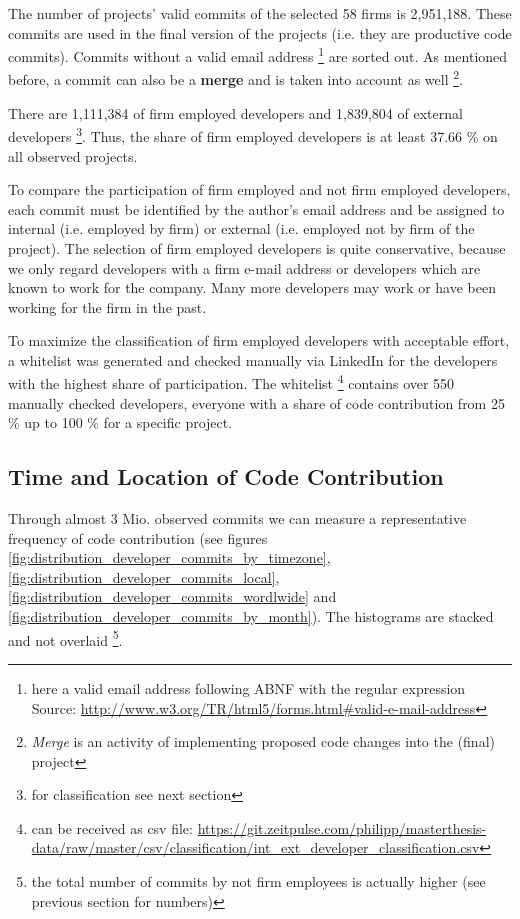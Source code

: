 The number of projects' valid commits of the selected 58 firms is 2,951,188. These commits are used in the final version of the projects (i.e. they are productive code commits). Commits without a valid email address \footnote{here a valid email address following ABNF with the regular expression
\tiny{}
Source: \url{http://www.w3.org/TR/html5/forms.html\#valid-e-mail-address}
} are sorted out. As mentioned before, a commit can also be a \textbf{merge} and is taken into account as well \footnote{\textit{Merge} is an activity of implementing proposed code changes into the (final) project}.

There are 1,111,384 of firm employed developers and 1,839,804 of external developers \footnote{for classification see next section}. Thus, the share of firm employed developers is at least 37.66 \% on all observed projects.

To compare the participation of firm employed and not firm employed developers, each commit must be identified by the author's email address and be assigned to internal (i.e. employed by firm) or external (i.e. employed not by firm of the project). The selection of firm employed developers is quite conservative, because we only regard developers with a firm e-mail address or developers which are known to work for the company. Many more developers may work or have been working for the firm in the past.

To maximize the classification of firm employed developers with acceptable effort, a whitelist was generated and checked manually via LinkedIn for the developers with the highest share of participation. The whitelist \footnote{can be received as csv file: \url{https://git.zeitpulse.com/philipp/masterthesis-data/raw/master/csv/classification/int_ext_developer_classification.csv}} contains over 550 manually checked developers, everyone with a share of code contribution from 25 \% up to  100 \% for a specific project.

\subsection{Time and Location of Code Contribution}

Through almost 3 Mio. observed commits we can measure a representative frequency of code contribution (see figures \ref{fig:distribution_developer_commits_by_timezone}, \ref{fig:distribution_developer_commits_local}, \ref{fig:distribution_developer_commits_wordlwide} and \ref{fig:distribution_developer_commits_by_month}). The histograms are stacked and not overlaid \footnote{the total number of commits by not firm employees is actually higher (see previous section for numbers)}.

